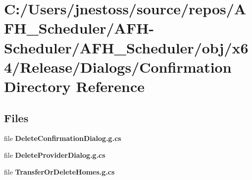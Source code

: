\section{C\+:/\+Users/jnestoss/source/repos/\+A\+F\+H\+\_\+\+Scheduler/\+A\+F\+H-\/\+Scheduler/\+A\+F\+H\+\_\+\+Scheduler/obj/x64/\+Release/\+Dialogs/\+Confirmation Directory Reference}
\label{dir_a66f836c1ed4bd2166611e7799c629ae}
\subsection*{Files}
\begin{DoxyCompactItemize}
\item 
file \textbf{ Delete\+Confirmation\+Dialog.\+g.\+cs}
\item 
file \textbf{ Delete\+Provider\+Dialog.\+g.\+cs}
\item 
file \textbf{ Transfer\+Or\+Delete\+Homes.\+g.\+cs}
\end{DoxyCompactItemize}
